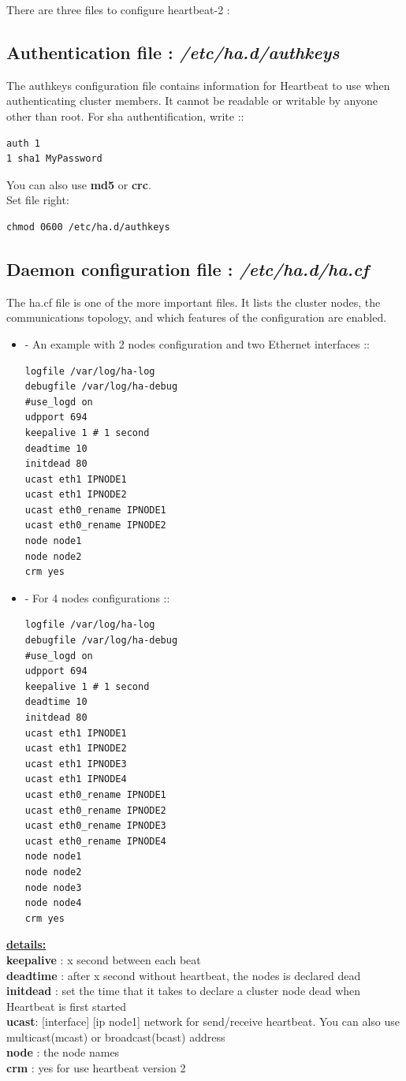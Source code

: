 \documentclass[a4paper,10pt]{report}
\begin{document}
There are three files to configure heartbeat-2 :
\subsection{Authentication file : \textit{/etc/ha.d/authkeys}}
The authkeys configuration file contains information for Heartbeat to use when authenticating cluster members. It cannot be readable or writable by anyone other than root. For sha authentification, write ::
\begin{lstlisting}
auth 1
1 sha1 MyPassword
\end{lstlisting}
You can also use \textbf{md5} or \textbf{crc}.\\
Set file right:
\begin{lstlisting}
chmod 0600 /etc/ha.d/authkeys
\end{lstlisting}

\subsection{Daemon configuration file : \textit{/etc/ha.d/ha.cf}}

The ha.cf file is one of the more important files. It lists the cluster nodes, the communications topology, and which features of the configuration are enabled. 
\begin{itemize}
\item - An example with 2 nodes configuration and two Ethernet interfaces ::
\begin{lstlisting}
logfile /var/log/ha-log
debugfile /var/log/ha-debug
#use_logd on
udpport 694
keepalive 1 # 1 second
deadtime 10
initdead 80
ucast eth1 IPNODE1
ucast eth1 IPNODE2
ucast eth0_rename IPNODE1
ucast eth0_rename IPNODE2
node node1
node node2
crm yes
\end{lstlisting}

\item - For 4 nodes configurations ::
\begin{lstlisting}
logfile /var/log/ha-log
debugfile /var/log/ha-debug
#use_logd on
udpport 694
keepalive 1 # 1 second
deadtime 10
initdead 80
ucast eth1 IPNODE1
ucast eth1 IPNODE2
ucast eth1 IPNODE3
ucast eth1 IPNODE4
ucast eth0_rename IPNODE1
ucast eth0_rename IPNODE2
ucast eth0_rename IPNODE3
ucast eth0_rename IPNODE4
node node1
node node2
node node3
node node4
crm yes
\end{lstlisting}
\end{itemize}

\textbf{\underline{details:}}\\
\textbf{keepalive} : x second between each beat\\
\textbf{deadtime} : after x second without heartbeat, the nodes is declared dead\\
\textbf{initdead} : set the time that it takes to declare a cluster node dead when Heartbeat is first started\\
\textbf{ucast}: [interface] [ip node1] network for send/receive heartbeat. You can also use multicast(mcast) or broadcast(bcast) address\\
\textbf{node} : the node names\\
\textbf{crm} : yes for use heartbeat version 2\\
\end{document}
